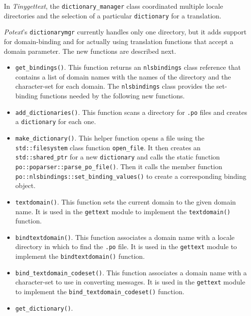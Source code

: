    In \textsl{Tinygettext}, the \texttt{dictionary\_manager} class 
   coordinated multiple locale directories and the selection of
   a particular \texttt{dictionary} for a translation.

   \textsl{Potext}'s \texttt{dictionarymgr}
   currently handles only one directory, but it
   adds support for domain-binding and for actually using translation
   functions that accept a domain parameter.
   The new functions are described next.

   \begin{itemize}
      \item \texttt{get\_bindings()}. This function returns an
         \texttt{nlsbindings} class reference that contains a list of domain
         names with the names of the directory and the character-set
         for each domain.
         The \texttt{nlsbindings} class provides the set-binding functions
         needed by the following new functions.
      \item \texttt{add\_dictionaries()}.
         This function scans a directory for \texttt{.po} files
         and creates a \texttt{dictionary} for each one.
      \item \texttt{make\_dictionary()}.
         This helper function opens a file using the \texttt{std::filesystem}
         class function \texttt{open\_file}.
         It then creates an \texttt{std::shared\_ptr} for a new
         \texttt{dictionary} and calls the static function
         \texttt{po::poparser::parse\_po\_file()}.
         Then it calls the member function
         \linebreak \texttt{po::nlsbindings::set\_binding\_values()}
         to create a corresponding binding object.
      \item \texttt{textdomain()}.
         This function sets the current domain to the given domain name.
         It is used in the \texttt{gettext} module to
         implement the \texttt{textdomain()} function.
      \item \texttt{bindtextdomain()}.
         This function associates a domain name with a locale directory
         in which to find the \texttt{.po} file.
         It is used in the \texttt{gettext} module to
         implement the \texttt{bindtextdomain()} function.
      \item \texttt{bind\_textdomain\_codeset()}.
         This function associates a domain name with a character-set to
         use in converting messages.
         It is used in the \texttt{gettext} module to
         implement the \texttt{bind\_textdomain\_codeset()} function.
      \item \texttt{get\_dictionary()}.
   \end{itemize}

